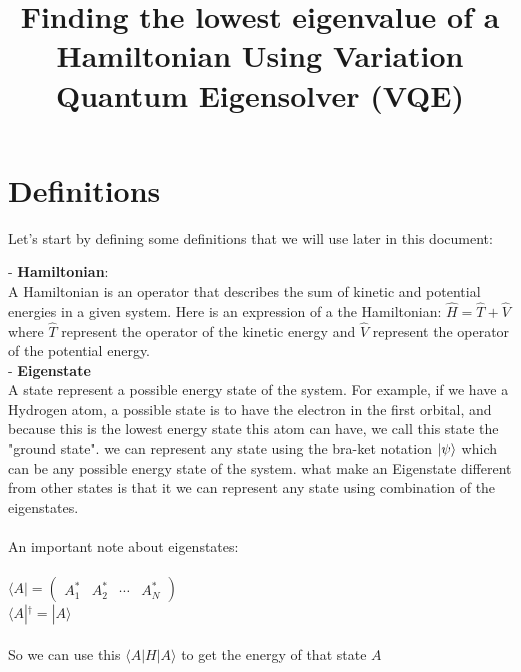 \documentclass[11pt]{article}
\date{}
\title{\vspace{-1cm}Finding the lowest eigenvalue of a Hamiltonian Using Variation Quantum Eigensolver (VQE)}
\begin{document}
	
	\maketitle	
	
	\vspace{-3cm}
	\thispagestyle{fancy}
	
	
	\section*{Definitions}
	
	
	{\addtolength{\leftskip}{7mm}
		
		
	Let's start by defining some definitions that we will use later in this document:
	
	- \textbf{Hamiltonian}:\\
	{\addtolength{\leftskip}{7mm} 
	A Hamiltonian is an operator that describes the sum of kinetic and potential energies in a given system. Here is an expression of a the Hamiltonian: 
	$\displaystyle {\hat{H}}={\hat{T}}+{\hat{V}}$\\
	where $\hat{T}$ represent the operator of the kinetic energy and $\hat{V}$ represent the operator of the potential energy.
	}\\
	
	- \textbf{Eigenstate}\\
	{\addtolength{\leftskip}{7mm}
	A state represent a possible energy state of the system. For example, if we have a Hydrogen atom, a possible state is to have the electron in the first orbital, and because this is the lowest energy state this atom can have, we call this state the "ground state". we can represent any state using the bra-ket notation $\ket{\psi}$ which can be any possible energy state of the system. what make an Eigenstate different from other states is that it we can represent any state using combination of the eigenstates.\\\\
	An important note about eigenstates:\\\\
	$\langle A| = {\begin{pmatrix}A_{1}^{*}&A_{2}^{*}&\cdots &A_{N}^{*}\end{pmatrix}}$\\
	$\langle A|^{\dagger }=|A\rangle$\\\\
	So we can use this $\langle A|H|A \rangle$ to get the energy of that state $A$
	}\\
	
}
\end{document}

